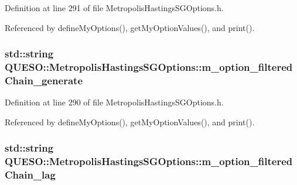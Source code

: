 Definition at line 291 of file Metropolis\-Hastings\-S\-G\-Options.\-h.



Referenced by define\-My\-Options(), get\-My\-Option\-Values(), and print().

\hypertarget{class_q_u_e_s_o_1_1_metropolis_hastings_s_g_options_abb60803a2ba0d32816a1ac9ad67fe7fd}{
\subsubsection[{m\-\_\-option\-\_\-filtered\-Chain\-\_\-generate}]{\setlength{\rightskip}{0pt plus 5cm}std\-::string Q\-U\-E\-S\-O\-::\-Metropolis\-Hastings\-S\-G\-Options\-::m\-\_\-option\-\_\-filtered\-Chain\-\_\-generate\hspace{0.3cm}{\ttfamily [private]}}}\label{class_q_u_e_s_o_1_1_metropolis_hastings_s_g_options_abb60803a2ba0d32816a1ac9ad67fe7fd}


Definition at line 290 of file Metropolis\-Hastings\-S\-G\-Options.\-h.



Referenced by define\-My\-Options(), get\-My\-Option\-Values(), and print().

\hypertarget{class_q_u_e_s_o_1_1_metropolis_hastings_s_g_options_aa3e984a031cf626281bccd866e603865}{
\subsubsection[{m\-\_\-option\-\_\-filtered\-Chain\-\_\-lag}]{\setlength{\rightskip}{0pt plus 5cm}std\-::string Q\-U\-E\-S\-O\-::\-Metropolis\-Hastings\-S\-G\-Options\-::m\-\_\-option\-\_\-filtered\-Chain\-\_\-lag\hspace{0.3cm}{\ttfamily [private]}}}\label{class_q_u_e_s_o_1_1_metropolis_hastings_s_g_options_aa3e984a031cf626281bccd866e603865}


